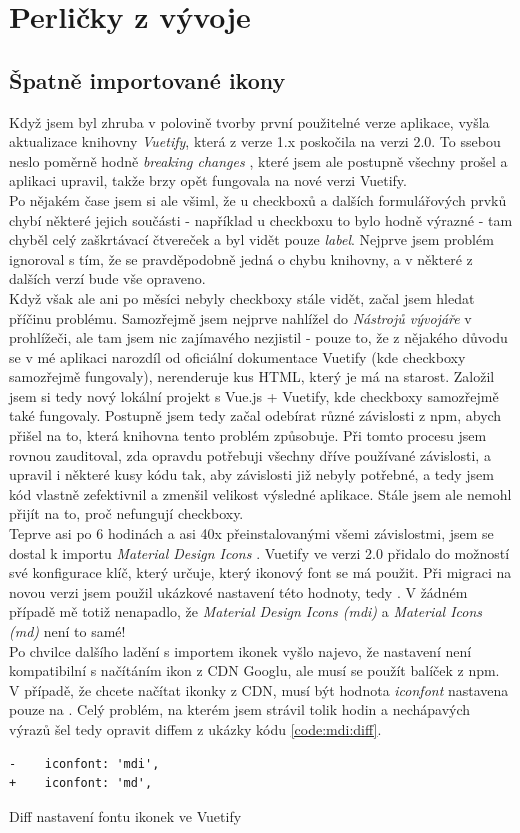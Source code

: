 \section{Perličky z vývoje}

\subsection{Špatně importované ikony}

Když jsem byl zhruba v polovině tvorby první použitelné verze aplikace, vyšla aktualizace knihovny \emph{Vuetify}, která z verze 1.x poskočila na verzi 2.0. To ssebou neslo poměrně hodně \emph{breaking changes} \cite{vuetify-2-upgrade}, které jsem ale postupně všechny prošel a aplikaci upravil, takže brzy opět fungovala na nové verzi Vuetify.\\
Po nějakém čase jsem si ale všiml, že u checkboxů a dalších formulářových prvků chybí některé jejich součásti - například u checkboxu to bylo hodně výrazné - tam chyběl celý zaškrtávací čtvereček a byl vidět pouze \emph{label}. Nejprve jsem problém ignoroval s tím, že se pravděpodobně jedná o chybu knihovny, a v některé z dalších verzí bude vše opraveno.\\
Když však ale ani po měsíci nebyly checkboxy stále vidět, začal jsem hledat příčinu problému. Samozřejmě jsem nejprve nahlížel do \emph{Nástrojů vývojáře} v prohlížeči, ale tam jsem nic zajímavého nezjistil - pouze to, že z nějakého důvodu se v mé aplikaci narozdíl od oficiální dokumentace Vuetify \cite{vuetify-doc-checkbox} (kde checkboxy samozřejmě fungovaly), nerenderuje kus HTML, který je má na starost. Založil jsem si tedy nový lokální projekt s Vue.js + Vuetify, kde checkboxy samozřejmě také fungovaly. Postupně jsem tedy začal odebírat různé závislosti z npm, abych přišel na to, která knihovna tento problém způsobuje. Při tomto procesu jsem rovnou zauditoval, zda opravdu potřebuji všechny dříve používané závislosti, a upravil i některé kusy kódu tak, aby závislosti již nebyly potřebné, a tedy jsem kód vlastně zefektivnil a zmenšil velikost výsledné aplikace. Stále jsem ale nemohl přijít na to, proč nefungují checkboxy.\\
Teprve asi po 6 hodinách a asi 40x přeinstalovanými všemi závislostmi, jsem se dostal k importu \emph{Material Design Icons} \cite{mdi}. Vuetify ve verzi 2.0 přidalo do možností své konfigurace klíč, který určuje, který ikonový font se má použit. Při migraci na novou verzi jsem použil ukázkové nastavení této hodnoty, tedy . V žádném případě mě totiž nenapadlo, že \emph{Material Design Icons (mdi)} a \emph{Material Icons (md)} není to samé!\\
Po chvilce dalšího ladění s importem ikonek vyšlo najevo, že nastavení  není kompatibilní s načítáním ikon z CDN Googlu, ale musí se použít balíček z npm. V případě, že chcete načítat ikonky z CDN, musí být hodnota \emph{iconfont} nastavena pouze na . Celý problém, na kterém jsem strávil tolik hodin a nechápavých výrazů šel tedy opravit diffem z ukázky kódu \ref{code:mdi:diff}.

\begin{listing}[h]
\begin{verbatim}
-    iconfont: 'mdi',
+    iconfont: 'md',
\end{verbatim}
\caption{Diff nastavení fontu ikonek ve Vuetify} \label{code:mdi:diff}
\end{listing}
